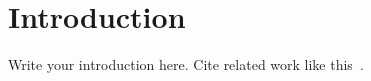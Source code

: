 \section{Introduction}
Write your introduction here. Cite related work like this~\citep{smith2021deep}.
